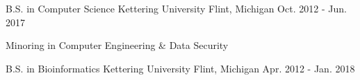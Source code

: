 

\begin{cventries}




  \cventry
    {B.S. in Computer Science} %
    {Kettering University} %
    {Flint, Michigan} %
    {Oct. 2012 - Jun. 2017} %
    {
      \begin{cvitems} %
        \item {Minoring in Computer Engineering \& Data Security}
      \end{cvitems}
    }

  \cventry
    {B.S. in Bioinformatics } %
    {Kettering University} %
    {Flint, Michigan} %
    {Apr. 2012 - Jan. 2018} %
    {
      \begin{cvitems} %
      \end{cvitems}
    }

\end{cventries}
